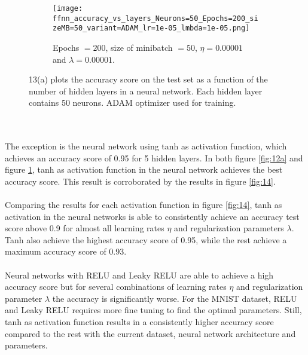 \documentclass[a4paper,twocolumn]{article}
\begin{document}
\begin{figure}[ht]
    \centering
    \begin{subfigure}[b]{\columnwidth}
        \texttt{[image: ffnn\_accuracy\_vs\_layers\_Neurons=50\_Epochs=200\_sizeMB=50\_variant=ADAM\_lr=1e-05\_lmbda=1e-05.png]}
        \caption{Epochs $= 200$, size of minibatch $= 50$, $\eta = 0.00001$ and $\lambda = 0.00001$.}
    \end{subfigure}
    \caption{13(a) plots the accuracy score on the test set as a function of the number of hidden layers in a neural network. Each hidden layer contains 50 neurons. ADAM optimizer used for training.}
    \label{fig:13a}
\end{figure}\\
\\
The exception is the neural network using tanh as activation function, which achieves an accuracy score of 0.95 for 5 hidden layers. In both figure \ref{fig:12a} and figure \ref{fig:13a}, tanh as activation function in the neural network achieves the best accuracy score. This result is corroborated by the results in figure \ref{fig:14}.\\
\\
Comparing the results for each activation function in figure \ref{fig:14}, tanh as activation in the neural networks is able to consistently achieve an accuracy test score above 0.9 for almost all learning rates $\eta$ and regularization parameters $\lambda$. Tanh also achieve the highest accuracy score of 0.95, while the rest achieve a maximum accuracy score of 0.93.\\
\\
Neural networks with RELU and Leaky RELU are able to achieve a high accuracy score but for several combinations of learning rates $\eta$ and regularization parameter $\lambda$ the accuracy is significantly worse. For the MNIST dataset, RELU and Leaky RELU requires more fine tuning to find the optimal parameters. Still, tanh as activation function results in a consistently higher accuracy score compared to the rest with the current dataset, neural network architecture and parameters.
\end{document}
